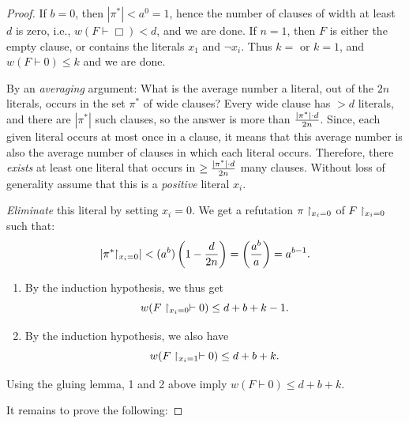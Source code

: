 \begin{proof}
\Base  If $b = 0$, then $|\pi^*| < a^0 = 1$, hence the number of clauses of width at least $d$ is zero, i.e., $w(F\vdash\Box)<d$, and we are done.
 If $n = 1$, then $F$ is either the empty clause, or contains the literals $x_1$ and $\neg x_i$. Thus $k=$ or $k=1$, and  $w(F \vdash 0) \le k$ and we are done.

\induction By an \textit{averaging} argument:  What is the average number a literal, out of the $2n$ literals, occurs in the set $\pi^*$ of wide clauses? Every wide clause has $> d$ literals, and there are $|\pi^*|$ such clauses, so the answer is more than  $\frac{|\pi^*|\cdot d}{2n}$. Since, each given literal occurs at most once in a clause, it means that this average number is also the average number of clauses in which each literal occurs. Therefore, there \emph{exists} at least one literal that occurs in $\ge \frac{|\pi^*|\cdot d}{2n}$ many clauses. 
Without loss of generality assume that this is a \emph{positive} literal $x_i$.
    
\textit{Eliminate} this literal by setting $x_i = 0$. We get a refutation $\pi\upharpoonright_{x_i = 0}$ of $F\upharpoonright_{x_i = 0}$ such that:
    \[
    \left|\pi^*\!\!\upharpoonright_{x_i = 0}\right| < (a^b) \left( 1 - \frac{d}{2n} \right) = \left( \frac{a^b}{a} \right) = a^{b-1}.
    \]

    \begin{enumerate}
        \item By the induction hypothesis, we thus get
        \[
        w(F\upharpoonright_{x_i = 0} \vdash 0) \leq d + b + k - 1.
        \]
        \item By the induction hypothesis, we also have
        \[
        w(F\upharpoonright_{x_i = 1} \vdash 0) \leq d + b + k.
        \]
    \end{enumerate}

    Using the gluing lemma, 1 and 2 above imply 
    $w(F \vdash 0) \leq d + b + k$.


\bigskip 
It remains to prove the following:



\end{proof}
